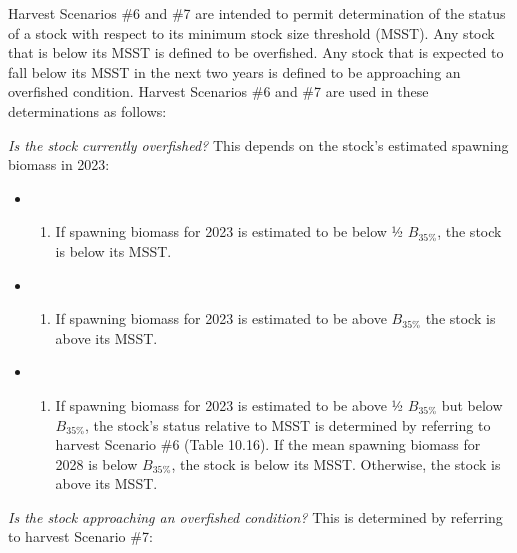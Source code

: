 \documentclass[
  11pt,
]{article}
\providecommand{\tightlist}{%
  \setlength{\itemsep}{0pt}\setlength{\parskip}{0pt}}
\begin{document}
Harvest Scenarios \#6 and \#7 are intended to permit determination of the status of a stock with respect to its minimum stock size threshold (MSST).
Any stock that is below its MSST is defined to be overfished.
Any stock that is expected to fall below its MSST in the next two years is defined to be approaching an overfished condition.
Harvest Scenarios \#6 and \#7 are used in these determinations as follows:

\emph{Is the stock currently overfished?} This depends on the stock's estimated spawning biomass in 2023:

\begin{itemize}
\item
  \begin{enumerate}
  \def\labelenumi{\alph{enumi}.}
  \tightlist
  \item
    If spawning biomass for 2023 is estimated to be below ½ \(B_{35\%}\), the stock is below its MSST.
  \end{enumerate}
\item
  \begin{enumerate}
  \def\labelenumi{\alph{enumi}.}
  \setcounter{enumi}{1}
  \tightlist
  \item
    If spawning biomass for 2023 is estimated to be above \(B_{35\%}\) the stock is above its MSST.
  \end{enumerate}
\item
  \begin{enumerate}
  \def\labelenumi{\alph{enumi}.}
  \setcounter{enumi}{2}
  \tightlist
  \item
    If spawning biomass for 2023 is estimated to be above ½ \(B_{35\%}\) but below \(B_{35\%}\), the stock's status relative to MSST is determined by referring to harvest Scenario \#6 (Table 10.16).
    If the mean spawning biomass for 2028 is below \(B_{35\%}\), the stock is below its MSST.
    Otherwise, the stock is above its MSST.
  \end{enumerate}
\end{itemize}

\emph{Is the stock approaching an overfished condition?} This is determined by referring to harvest Scenario \#7:
\end{document}
